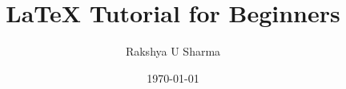 \documentclass[12pt,journal,compsoc]{IEEEtran}
\begin{document}

\title{LaTeX Tutorial for Beginners}
\author{Rakshya U Sharma}

\date{\today}		%

%
% 



\end{document}

